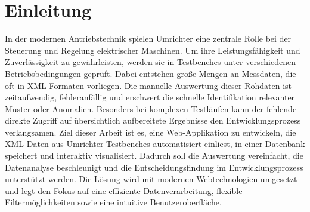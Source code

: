 


\newpage
\section{Einleitung}
\label{Einleitung}
In der modernen Antriebstechnik spielen Umrichter eine zentrale Rolle bei der Steuerung und Regelung elektrischer Maschinen.
Um ihre Leistungsfähigkeit und Zuverlässigkeit zu gewährleisten, werden sie in Testbenches unter verschiedenen Betriebsbedingungen geprüft.
Dabei entstehen große Mengen an Messdaten, die oft in XML-Formaten vorliegen.
Die manuelle Auswertung dieser Rohdaten ist zeitaufwendig, fehleranfällig und erschwert die schnelle Identifikation relevanter Muster oder Anomalien.
Besonders bei komplexen Testläufen kann der fehlende direkte Zugriff auf übersichtlich aufbereitete Ergebnisse den Entwicklungsprozess verlangsamen.
Ziel dieser Arbeit ist es, eine Web-Applikation zu entwickeln, die XML-Daten aus Umrichter-Testbenches automatisiert einliest, in einer Datenbank speichert und interaktiv visualisiert.
Dadurch soll die Auswertung vereinfacht, die Datenanalyse beschleunigt und die Entscheidungsfindung im Entwicklungsprozess unterstützt werden.
Die Lösung wird mit modernen Webtechnologien umgesetzt und legt den Fokus auf eine effiziente Datenverarbeitung, flexible Filtermöglichkeiten sowie eine intuitive Benutzeroberfläche.




